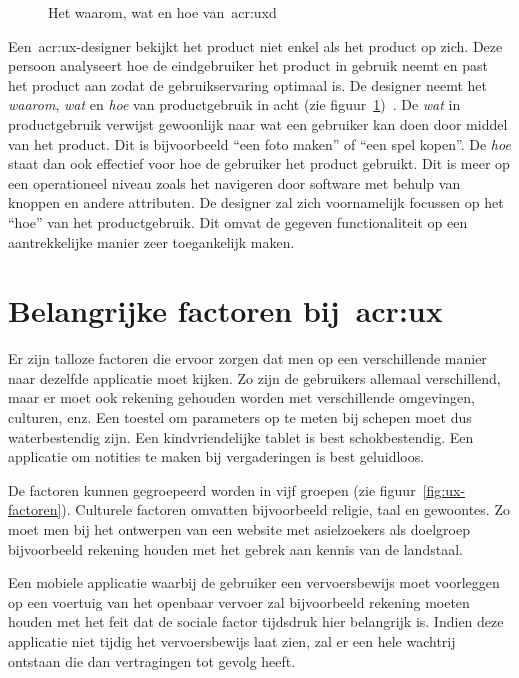 \begin{figure}[h]
    \centering
    \def\svgwidth{.8\columnwidth}
    
    \caption{Het waarom, wat en hoe van~\acrlong{acr:uxd}}
    \label{fig:ux-waarom-wat-hoe}
\end{figure}

Een~\acrshort{acr:ux}-designer bekijkt het product niet enkel als het product op zich. Deze persoon analyseert hoe de eindgebruiker het product in gebruik neemt en past het product aan zodat de gebruikservaring optimaal is. De designer neemt het \textit{waarom}, \textit{wat} en \textit{hoe} van productgebruik in acht (zie figuur~\ref{fig:ux-waarom-wat-hoe})~\autocite{Hassenzahl2013}. De \textit{wat} in productgebruik verwijst gewoonlijk naar wat een gebruiker kan doen door middel van het product. Dit is bijvoorbeeld ``een foto maken'' of ``een spel kopen''. De \textit{hoe} staat dan ook effectief voor hoe de gebruiker het product gebruikt. Dit is meer op een operationeel niveau zoals het navigeren door software met behulp van knoppen en andere attributen. De designer zal zich voornamelijk focussen op het ``hoe'' van het productgebruik. Dit omvat de gegeven functionaliteit op een aantrekkelijke manier zeer toegankelijk maken.

\section{Belangrijke factoren bij~\acrlong{acr:ux}}
\label{sec:belangrijke-factoren-bij-user-experience}

Er zijn talloze factoren die ervoor zorgen dat men op een verschillende manier naar dezelfde applicatie moet kijken. Zo zijn de gebruikers allemaal verschillend, maar er moet ook rekening gehouden worden met verschillende omgevingen, culturen, enz. Een toestel om parameters op te meten bij schepen moet dus waterbestendig zijn. Een kindvriendelijke tablet is best schokbestendig. Een applicatie om notities te maken bij vergaderingen is best geluidloos.

De factoren kunnen gegroepeerd worden in vijf groepen (zie figuur~\ref{fig:ux-factoren}). Culturele factoren omvatten bijvoorbeeld religie, taal en gewoontes. Zo moet men bij het ontwerpen van een website met asielzoekers als doelgroep bijvoorbeeld rekening houden met het gebrek aan kennis van de landstaal.

Een mobiele applicatie waarbij de gebruiker een vervoersbewijs moet voorleggen op een voertuig van het openbaar vervoer zal bijvoorbeeld rekening moeten houden met het feit dat de sociale factor tijdsdruk hier belangrijk is. Indien deze applicatie niet tijdig het vervoersbewijs laat zien, zal er een hele wachtrij ontstaan die dan vertragingen tot gevolg heeft.

